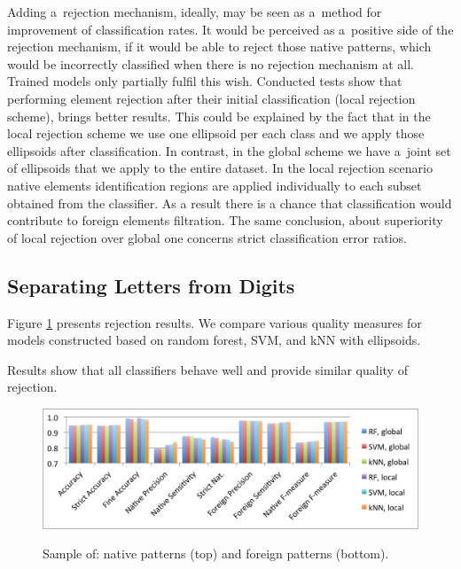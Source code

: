 \documentclass{llncs}
\begin{document}
Adding a~rejection mechanism, ideally, may be seen as a~method for improvement of classification rates. It would be perceived as a~positive side of the rejection mechanism, if it would be able to reject those native patterns, which would be incorrectly classified when there is no rejection mechanism at all. Trained models only partially fulfil this wish. Conducted tests show that performing element rejection after their initial classification (local rejection scheme), brings better results. This could be explained by the fact that in the local rejection scheme we use one ellipsoid per each class and we apply those ellipsoids after classification. In contrast, in the global scheme we have a~joint set of ellipsoids that we apply to the entire dataset. In the local rejection scenario native elements identification regions are applied individually to each subset obtained from the classifier. As a result there is a chance that classification would contribute to foreign elements filtration. The same conclusion, about superiority of local rejection over global one concerns strict classification error ratios.

\subsection{Separating Letters from Digits}

Figure \ref{fig:Measures} presents rejection results. We compare various quality measures for models constructed based on random forest, SVM, and kNN with ellipsoids. 

Results show that all classifiers behave well and provide similar quality of rejection.   

\begin{figure}[!htbp]
  \centering
  \includegraphics[width=\textwidth]{_Figures/Measures}\\
  \caption{Sample of: native patterns (top) and foreign patterns (bottom).}
\label{fig:Measures}
\vspace{-6pt}
\end{figure}
\end{document}

